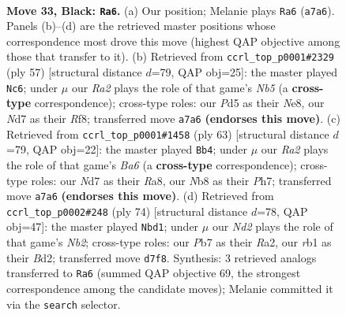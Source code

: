 \documentclass[11pt]{article}
\begin{document}
\clearpage

\begin{figure}[p]\centering
\begin{subfigure}{0.46\textwidth}\centering
\resizebox{\linewidth}{!}{%
\newchessgame
\chessboard[
  setfen={1nb5/rp1n2k1/5p2/p2p2p1/1b4Pp/NP2P2P/PB2PK2/1R1B4 b - - 1 33},
  showmover=false,
  pgfstyle=straightmove, color=movearrow, markmove={a7-a6}
]}
\caption{}
\end{subfigure}\hfill
\begin{subfigure}{0.46\textwidth}\centering
\resizebox{\linewidth}{!}{%
\newchessgame
\chessboard[
  setfen={4nrk1/1p3pp1/pB2p2p/P3P3/Nn6/8/1P1bB1PP/5R1K b - - 0 29},
  showmover=false,
  pgfstyle=straightmove, color=movearrow, markmove={b4-c6}
]}
\caption{}
\end{subfigure}
\\[4pt]
\begin{subfigure}{0.46\textwidth}\centering
\resizebox{\linewidth}{!}{%
\newchessgame
\chessboard[
  setfen={r7/1b5p/1p2kn2/1Pp1p3/2P2p2/b1B2P2/2R1BNPP/6K1 b - - 9 32},
  showmover=false,
  pgfstyle=straightmove, color=movearrow, markmove={a3-b4}
]}
\caption{}
\end{subfigure}\hfill
\begin{subfigure}{0.46\textwidth}\centering
\resizebox{\linewidth}{!}{%
\newchessgame
\chessboard[
  setfen={5b2/kbnr4/pp6/2p1Pp2/P1P2P1R/3PNr2/RN1B4/4K3 w - - 6 38},
  showmover=false,
  pgfstyle=straightmove, color=movearrow, markmove={b2-d1}
]}
\caption{}
\end{subfigure}
\caption{\textbf{Move 33, Black: \texttt{Ra6}.} (a) Our position; Melanie plays \texttt{Ra6} (\texttt{a7a6}). Panels (b)--(d) are the retrieved master positions whose correspondence most drove this move (highest QAP objective among those that transfer to it). (b) Retrieved from \texttt{ccrl\_top\_p0001\#2329} (ply 57) [structural distance $d$=79, QAP obj=25]: the master played \texttt{Nc6}; under $\mu$ our \emph{Ra2} plays the role of that game's \emph{Nb5} (a \textbf{cross-type} correspondence); cross-type roles: our \emph{P}d5 as their \emph{N}e8, our \emph{N}d7 as their \emph{R}f8; transferred move \texttt{a7a6} \textbf{(endorses this move)}. (c) Retrieved from \texttt{ccrl\_top\_p0001\#1458} (ply 63) [structural distance $d$=79, QAP obj=22]: the master played \texttt{Bb4}; under $\mu$ our \emph{Ra2} plays the role of that game's \emph{Ba6} (a \textbf{cross-type} correspondence); cross-type roles: our \emph{N}d7 as their \emph{R}a8, our \emph{N}b8 as their \emph{P}h7; transferred move \texttt{a7a6} \textbf{(endorses this move)}. (d) Retrieved from \texttt{ccrl\_top\_p0002\#248} (ply 74) [structural distance $d$=78, QAP obj=47]: the master played \texttt{Nbd1}; under $\mu$ our \emph{Nd2} plays the role of that game's \emph{Nb2}; cross-type roles: our \emph{P}b7 as their \emph{R}a2, our \emph{r}b1 as their \emph{B}d2; transferred move \texttt{d7f8}. Synthesis: 3 retrieved analogs transferred to \texttt{Ra6} (summed QAP objective 69, the strongest correspondence among the candidate moves); Melanie committed it via the \texttt{search} selector.}
\label{fig:thought-m65}
\end{figure}
\end{document}
